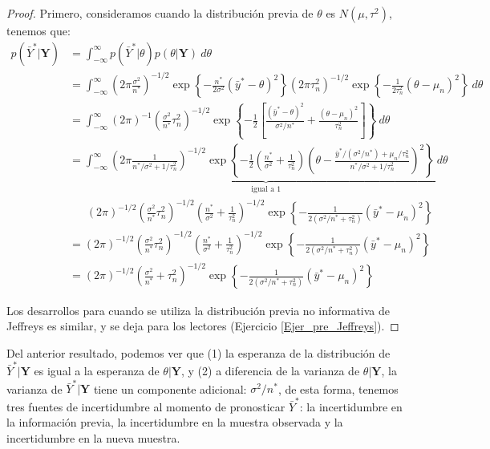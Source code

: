     \begin{proof}
    Primero, consideramos cuando la distribuci\'on previa de $\theta$ es $N(\mu,\tau^2)$, tenemos que:
    \begin{align*}
    p(\bar{Y}^*|\mathbf{Y})&=\int_{-\infty}^\infty p(\bar{Y}^*|\theta)p(\theta|\mathbf{Y})\ d\theta\\
    &=\int_{-\infty}^\infty (2\pi\frac{\sigma^2}{n^*})^{-1/2}\exp\left\{-\frac{n^*}{2\sigma^2}(\bar{y}^*-\theta)^2\right\}
    (2\pi\tau_n^2)^{-1/2}\exp\left\{-\frac{1}{2\tau_n^2}(\theta-\mu_n)^2\right\}\ d\theta\\
    &=\int_{-\infty}^\infty (2\pi)^{-1}(\frac{\sigma^2}{n^*}\tau_n^2)^{-1/2}\exp\left\{-\frac{1}{2}\left[\frac{(\bar{y}^*-\theta)^2}{\sigma^2/n^*}+\frac{(\theta-\mu_n)^2}{\tau^2_n}\right]\right\}\ d\theta\\
    &=\underbrace{\int_{-\infty}^\infty(2\pi\frac{1}{n^*/\sigma^2+1/\tau^2_n})^{-1/2}\exp\left\{-\frac{1}{2}\left(\frac{n^*}{\sigma^2}+\frac{1}{\tau^2_n}\right)\left(\theta-\frac{\bar{y}^*/(\sigma^2/n^*)+\mu_n/\tau^2_n}{n^*/\sigma^2+1/\tau^2_n}\right)^2\right\}\ d\theta}_{\text{igual a 1}}\\
    &\ \ \ \ \ \ \ (2\pi)^{-1/2}(\frac{\sigma^2}{n^*}\tau_n^2)^{-1/2}(\frac{n^*}{\sigma^2}+\frac{1}{\tau^2_n})^{-1/2}\exp\left\{-\frac{1}{2(\sigma^2/n^*+\tau^2_n)}(\bar{y}^*-\mu_n)^2\right\}\\
    &=(2\pi)^{-1/2}(\frac{\sigma^2}{n^*}\tau_n^2)^{-1/2}(\frac{n^*}{\sigma^2}+\frac{1}{\tau^2_n})^{-1/2}\exp\left\{-\frac{1}{2(\sigma^2/n^*+\tau^2_n)}(\bar{y}^*-\mu_n)^2\right\}\\
    &=(2\pi)^{-1/2}(\frac{\sigma^2}{n^*}+\tau^2_n)^{-1/2}\exp\left\{-\frac{1}{2(\sigma^2/n^*+\tau^2_n)}(\bar{y}^*-\mu_n)^2\right\}
    \end{align*}
    
    Los desarrollos para cuando se utiliza la distribuci\'on previa no informativa de Jeffreys es similar, y se deja para los lectores (Ejercicio \ref{Ejer_pre_Jeffreys}). 
    \end{proof}
    
    Del anterior resultado, podemos ver que (1) la esperanza de la distribuci\'on de $\bar{Y}^*|\mathbf{Y}$ es igual a la esperanza de $\theta|\mathbf{Y}$, y (2) a diferencia de la varianza de $\theta|\mathbf{Y}$, la varianza de $\bar{Y}^*|\mathbf{Y}$ tiene un componente adicional: $\sigma^2/n^*$, de esta forma, tenemos tres fuentes de incertidumbre al momento de pronosticar $\bar{Y}^*$: la incertidumbre en la informaci\'on previa, la incertidumbre en la muestra observada y la incertidumbre en la nueva muestra.
    
